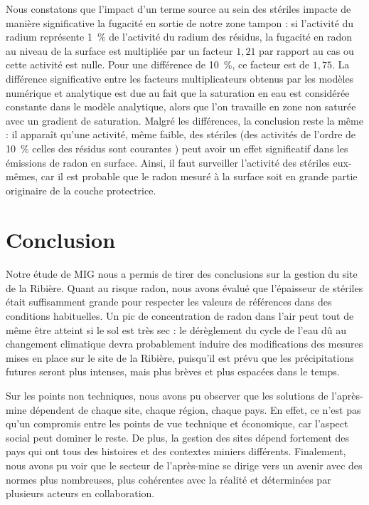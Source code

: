 \documentclass{article}
\begin{document}
Nous constatons que l'impact d'un terme source au sein des stériles impacte de manière significative la fugacité en sortie de notre zone tampon : si l'activité du radium représente 1~\% de l'activité du radium des résidus, la fugacité en radon au niveau de la surface est multipliée par un facteur $1,21$ par rapport au cas ou cette activité est nulle. Pour une différence de 10~\%, ce facteur est de $1,75$. La différence significative entre les facteurs multiplicateurs obtenus par les modèles numérique et analytique est due au fait que la saturation en eau est considérée constante dans le modèle analytique, alors que l'on travaille en zone non saturée avec un gradient de saturation. Malgré les différences, la conclusion reste la même : il apparaît qu'une activité, même faible, des stériles (des activités de l'ordre de 10~\% celles des résidus sont courantes \cite{ferry_evaluation_2002}) peut avoir un effet significatif dans les émissions de radon en surface. Ainsi, il faut surveiller l'activité des stériles eux-mêmes, car il est probable que le radon mesuré à la surface soit en grande partie originaire de la couche protectrice.

\newpage
\section*{Conclusion}

\paragraph{} Notre étude de MIG nous a permis de tirer des conclusions sur la gestion du site de la Ribière. %
Quant au risque radon, nous avons évalué que l'épaisseur de stériles était suffisamment grande pour respecter les valeurs de références dans des conditions habituelles. Un pic de concentration de radon dans l'air peut tout de même être atteint si le sol est très sec : le dérèglement du cycle de l'eau dû au changement climatique devra probablement induire des modifications des mesures mises en place sur le site de la Ribière, puisqu'il est prévu que les précipitations futures seront plus intenses, mais plus brèves et plus espacées dans le temps.

Sur les points non techniques, nous avons pu observer que les solutions de l'après-mine dépendent de chaque site, chaque région, chaque pays. En effet, ce n'est pas qu'un compromis entre les points de vue technique et économique, car l'aspect social peut dominer le reste. De plus, la gestion des sites dépend fortement des pays qui ont tous des histoires et des contextes miniers différents. Finalement, nous avons pu voir que le secteur de l'après-mine se dirige vers un avenir avec des normes plus nombreuses, plus cohérentes avec la réalité et déterminées par plusieurs acteurs en collaboration.
\end{document}
